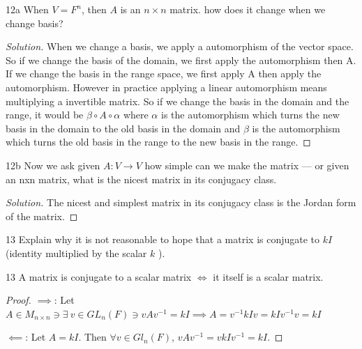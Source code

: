 \documentclass{article}
\newenvironment{solution}
{\renewcommand\qedsymbol{$\blacksquare$}\begin{proof}[Solution]}
{\end{proof}}
\begin{document}
\bigskip

\begin{PROB}{12a}\label{Problem 12a.}
    When $V = F^n$, then $A$ is an $n \times n$ matrix. how does it change when we change basis? 
\end{PROB}
\begin{solution}
    When we change a basis, we apply a automorphism of the vector space. So if we change the basis of the domain, we first apply the automorphism then A. If we change the basis in the range space, we first apply A then apply the automorphism. However in practice applying a linear automorphism means multiplying a invertible matrix. So if we change the basis in the domain and the range, it would be $\beta \circ A \circ \alpha$ where $\alpha$ is the automorphism which turns the new basis in the domain to the old basis in the domain  and $\beta$ is the automorphism which turns the old basis in the range to the new basis in the range.
\end{solution}

\bigskip

\begin{PROB}{12b}\label{Problem 12b.}
    Now we ask given $A: V \to V$ how simple can we make the matrix — or given an nxn matrix, what is the nicest matrix in its conjugacy class. 
\end{PROB}
\begin{solution}
    The nicest and simplest matrix in its conjugacy class is the Jordan form of the matrix. 
\end{solution}

\bigskip

\begin{PROB}{13}\label{Problem 13.}
    Explain why it is not reasonable to hope that a matrix is conjugate to $kI$ (identity multiplied by the scalar $k$ ).
\end{PROB}
\begin{claim}{13}\label{Claim 13.}
    A matrix is conjugate to a scalar matrix $\iff$ it itself is a scalar matrix.
\end{claim}
\begin{proof}
$\implies$: Let $A \in M_{n \times n} \ni \exists ~ v \in GL_n(F) \ni vAv^{-1} = kI \implies A = v^{-1}kIv = kIv^{-1}v = kI$

$\impliedby$: Let $A = kI$. Then $\forall v \in Gl_n(F)$, $vAv^{-1} = vkIv^{-1} = kI$.
\end{proof}

\bigskip
\end{document}
